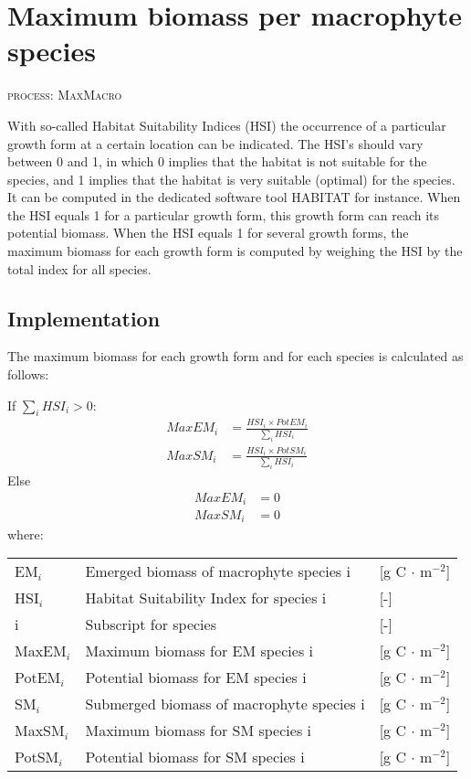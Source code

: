 \section{Maximum biomass per macrophyte species}
\begin{flushright}
\textsc{process: MaxMacro}
\end{flushright}

With so-called Habitat Suitability Indices (HSI) the occurrence of a particular growth form at a certain
location can be indicated. The HSI's should vary between 0 and 1, in which 0 implies that the habitat is
not suitable for the species, and 1 implies that the habitat is very suitable (optimal) for the species.
It can be computed in the dedicated software tool HABITAT for instance. When the HSI equals 1 for a particular
growth form, this growth form can reach its potential biomass. When the HSI equals 1 for several growth forms,
the maximum biomass for each growth form is computed by weighing the HSI by the total index for all species.

\subsection{Implementation}
The maximum biomass for each growth form and for each species is calculated as follows:

\noindent If $\sum_{i} HSI_i > 0$:
\begin{align}
             MaxEM_i &=  \frac{HSI_i \times PotEM_i}{\sum_{i} HSI_i} \\
   \nonumber MaxSM_i &=  \frac{HSI_i \times PotSM_i}{\sum_{i} HSI_i}
\end{align}
\noindent Else
\begin{align}
   \nonumber MaxEM_i &= 0 \\
   \nonumber MaxSM_i &= 0
\end{align}
%
where:

\begin{tabular}{lll}
EM$_i$     & Emerged biomass of macrophyte species i    & [g C $\cdot$ m$^{-2}$]  \\
HSI$_i$    & Habitat Suitability Index for species i    & [-]                     \\
i          & Subscript for species                      & [-]                     \\
MaxEM$_i$  & Maximum biomass for EM species i           & [g C $\cdot$ m$^{-2}$]  \\
PotEM$_i$  & Potential biomass for EM species i         & [g C $\cdot$ m$^{-2}$]  \\
SM$_i$     & Submerged biomass of macrophyte species i  & [g C $\cdot$ m$^{-2}$]  \\
MaxSM$_i$  & Maximum biomass for SM species i           & [g C $\cdot$ m$^{-2}$]  \\
PotSM$_i$  & Potential biomass for SM species i         & [g C $\cdot$ m$^{-2}$]  \\
\end{tabular}

